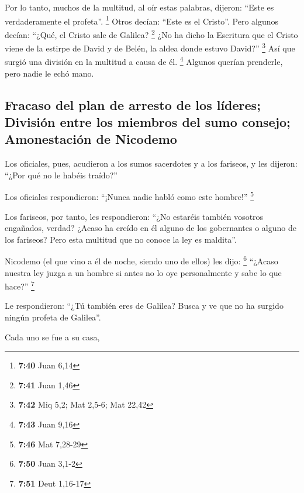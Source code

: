 \begin{paracol}{2}
 Por lo tanto, muchos de la multitud, al oír estas
palabras, dijeron: ``Este es verdaderamente el profeta''. \footnote{\textbf{7:40}
  Juan 6,14}  Otros decían: ``Este es el Cristo''. Pero
algunos decían: ``¿Qué, el Cristo sale de Galilea? \footnote{\textbf{7:41}
  Juan 1,46}  ¿No ha dicho la Escritura que el Cristo
viene de la estirpe de David y de Belén, la aldea donde estuvo David?''
\footnote{\textbf{7:42} Miq 5,2; Mat 2,5-6; Mat 22,42} 
Así que surgió una división en la multitud a causa de él. \footnote{\textbf{7:43}
  Juan 9,16}  Algunos querían prenderle, pero nadie le
echó mano.

\hypertarget{fracaso-del-plan-de-arresto-de-los-luxedderes-divisiuxf3n-entre-los-miembros-del-sumo-consejo-amonestaciuxf3n-de-nicodemo}{%
\subsection{Fracaso del plan de arresto de los líderes; División entre
los miembros del sumo consejo; Amonestación de
Nicodemo}\label{fracaso-del-plan-de-arresto-de-los-luxedderes-divisiuxf3n-entre-los-miembros-del-sumo-consejo-amonestaciuxf3n-de-nicodemo}}

 Los oficiales, pues, acudieron a los sumos sacerdotes y
a los fariseos, y les dijeron: ``¿Por qué no le habéis traído?''

 Los oficiales respondieron: ``¡Nunca nadie habló como
este hombre!'' \footnote{\textbf{7:46} Mat 7,28-29}

 Los fariseos, por tanto, les respondieron: ``¿No
estaréis también vosotros engañados, verdad?  ¿Acaso ha
creído en él alguno de los gobernantes o alguno de los fariseos?
 Pero esta multitud que no conoce la ley es maldita''.

 Nicodemo (el que vino a él de noche, siendo uno de
ellos) les dijo: \footnote{\textbf{7:50} Juan 3,1-2} 
``¿Acaso nuestra ley juzga a un hombre si antes no lo oye personalmente
y sabe lo que hace?'' \footnote{\textbf{7:51} Deut 1,16-17}

 Le respondieron: ``¿Tú también eres de Galilea? Busca y
ve que no ha surgido ningún profeta de Galilea''.

 Cada uno se fue a su casa,

\switchcolumn
\begin{otherlanguage}{english}


\end{otherlanguage}
\end{paracol}
